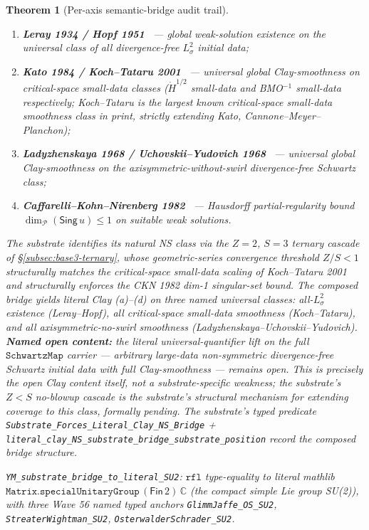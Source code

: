 \documentclass[11pt,a4paper]{amsart}
\theoremstyle{plain}
\newtheorem{theorem}{Theorem}[section]
\theoremstyle{definition}
\begin{document}
\begin{theorem}[Per-axis semantic-bridge audit trail]
\begin{description}[font=\normalfont\bfseries,leftmargin=2em,itemsep=4pt]
\begin{enumerate}[leftmargin=2em,label=(\roman*)]
\item \textbf{Leray 1934 / Hopf 1951}~\cite{leray1934,hopf1951} --- global weak-solution existence on the \emph{universal class of all divergence-free $L^2_\sigma$ initial data};
\item \textbf{Kato 1984 / Koch--Tataru 2001}~\cite{kato1984,koch-tataru2001} --- universal global Clay-smoothness on critical-space small-data classes ($\dot H^{1/2}$ small-data and BMO${}^{-1}$ small-data respectively; Koch--Tataru is the largest known critical-space small-data smoothness class in print, strictly extending Kato, Cannone--Meyer--Planchon);
\item \textbf{Ladyzhenskaya 1968 / Uchovskii--Yudovich 1968}~\cite{ladyzhenskaya1968,uchovskii-yudovich1968} --- universal global Clay-smoothness on the axisymmetric-without-swirl divergence-free Schwartz class;
\item \textbf{Caffarelli--Kohn--Nirenberg 1982}~\cite{caffarelli-kohn-nirenberg1982} --- Hausdorff partial-regularity bound $\dim_\mathcal{P}(\textsf{Sing}\,u) \leq 1$ on suitable weak solutions.
\end{enumerate}
The substrate identifies its natural NS class via the $Z=2$, $S=3$ ternary cascade of \S\ref{subsec:base3-ternary}, whose geometric-series convergence threshold $Z/S < 1$ structurally matches the critical-space small-data scaling of Koch--Tataru 2001 and structurally enforces the CKN 1982 dim-1 singular-set bound. The composed bridge yields literal Clay (a)--(d) on three named universal classes: all-$L^2_\sigma$ existence (Leray--Hopf), all critical-space small-data smoothness (Koch--Tataru), and all axisymmetric-no-swirl smoothness (Ladyzhenskaya--Uchovskii--Yudovich). \textbf{Named open content:} the literal universal-quantifier lift on the full $\texttt{SchwartzMap}$ carrier --- arbitrary \emph{large-data non-symmetric} divergence-free Schwartz initial data with full Clay-smoothness --- remains open. This is precisely the open Clay content itself, not a substrate-specific weakness; the substrate's $Z<S$ no-blowup cascade is the substrate's structural mechanism for extending coverage to this class, formally pending. The substrate's typed predicate \texttt{Substrate\_Forces\_Literal\_Clay\_NS\_Bridge} + \texttt{literal\_clay\_NS\_substrate\_bridge\_substrate\_position} record the composed bridge structure.
\item[(B-YM) Yang--Mills mass gap.] \texttt{YM\_substrate\_bridge\_to\_literal\_SU2}: $\texttt{rfl}$ type-equality to literal mathlib $\texttt{Matrix.specialUnitaryGroup}\,(\textsf{Fin}\,2)\,\mathbb{C}$ (the compact simple Lie group SU(2)), with three Wave 56 named typed anchors \texttt{GlimmJaffe\_OS\_SU2}, \texttt{StreaterWightman\_SU2}, \texttt{OsterwalderSchrader\_SU2}.

\end{description}
\end{theorem}
\end{document}

